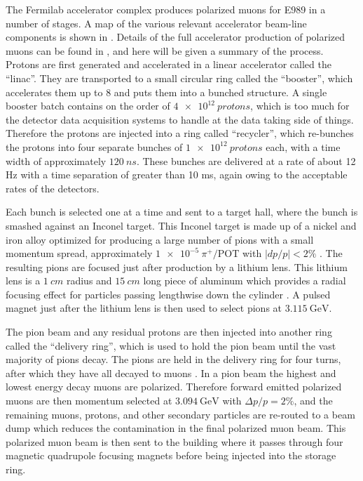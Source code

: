 The Fermilab accelerator complex produces polarized muons for E989 in a number of stages. A map of the various relevant accelerator beam-line components is shown in . Details of the full accelerator production of polarized muons can be found in , and here will be given a summary of the process. Protons are first generated and accelerated in a linear accelerator called the ``linac''. They are transported to a small circular ring called the ``booster'', which accelerates them up to 8 \GeV and puts them into a bunched structure. A single booster batch contains on the order of $\SI{4e12}{protons}$, which is too much for the detector data acquisition systems to handle at the data taking side of things. Therefore the protons are injected into a ring called ``recycler'', which re-bunches the protons into four separate bunches of $\SI{1e12}{protons}$ each, with a time width of approximately $\SI{120}{ns}$. These bunches are delivered at a rate of about 12 Hz with a time separation of greater than 10 ms, again owing to the acceptable rates of the \gmtwo detectors.

Each bunch is selected one at a time and sent to a target hall, where the bunch is smashed against an Inconel target. This Inconel target is made up of a nickel and iron alloy optimized for producing a large number of pions with a small momentum spread, approximately $\SI{1e-5}{\pi^{+}/\text{POT}}$ with $|dp/p| < 2 \%$ \cite{Stratakis:2017uci}. The resulting pions are focused just after production by a lithium lens. This lithium lens is a $\SI{1}{cm}$ radius and $\SI{15}{cm}$ long piece of aluminum which provides a radial focusing effect for particles passing lengthwise down the cylinder \cite{LiLens}. A pulsed magnet just after the lithium lens is then used to select pions at $\SI{3.115}{\GeV}$.

The pion beam and any residual protons are then injected into another ring called the ``delivery ring'', which is used to hold the pion beam until the vast majority of pions decay. The pions are held in the delivery ring for four turns, after which they have all decayed to muons \cite{Stratakis:2017uci}. In a pion beam the highest and lowest energy decay muons are polarized. Therefore forward emitted polarized muons are then momentum selected at $\SI{3.094}{\GeV}$ with $\Delta p / p = 2\%$, and the remaining muons, protons, and other secondary particles are re-routed to a beam dump which reduces the contamination in the final polarized muon beam. This polarized muon beam is then sent to the \gmtwo building where it passes through four magnetic quadrupole focusing magnets before being injected into the storage ring.

